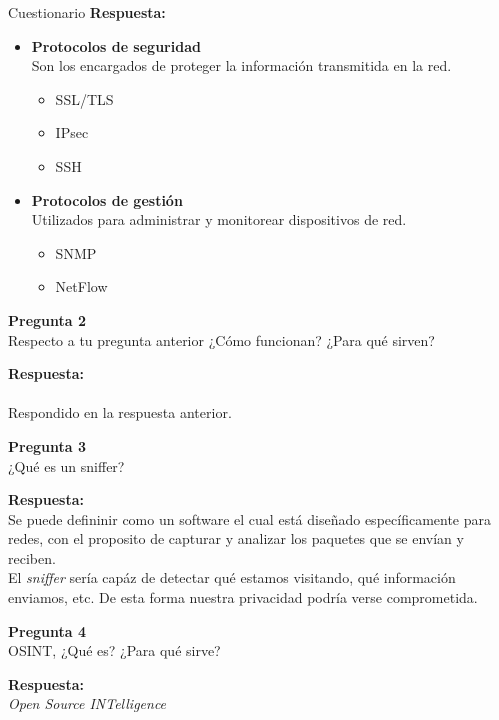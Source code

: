 \documentclass{article}
\newenvironment{problem}[2][Pregunta]
    { \begin{mdframed}[backgroundcolor=gray!20] \textbf{#1 #2} \\}
    {  \end{mdframed}}
\newenvironment{solution}
    {\textbf{Respuesta:\\}}
    {}
\begin{document}
\begin{section}{Cuestionario}
\begin{solution}
\begin{itemize}
        \item \textbf{Protocolos de seguridad}\\
        Son los encargados de proteger la información transmitida en la red.
        \begin{itemize}
            \item SSL/TLS
            \item IPsec
            \item SSH
        \end{itemize}

        \item \textbf{Protocolos de gestión}\\
        Utilizados para administrar y monitorear dispositivos de red.
        \begin{itemize}
            \item SNMP
            \item NetFlow
        \end{itemize}
    \end{itemize}
\end{solution}

\begin{problem}
    {2} Respecto a tu pregunta anterior ¿Cómo funcionan? ¿Para qué sirven?
\end{problem}

\begin{solution}\\
Respondido en la respuesta anterior.
\end{solution}  

\begin{problem}
    {3} ¿Qué es un sniffer?
\end{problem}

\begin{solution}
Se puede defininir como un software el cual está diseñado específicamente para redes, con el proposito de capturar y analizar los paquetes que se envían y reciben.\\
El \textit{sniffer} sería capáz de detectar qué estamos visitando, qué información enviamos, etc. De esta forma nuestra privacidad podría verse comprometida.
\end{solution}

\begin{problem}
    {4} OSINT, ¿Qué es? ¿Para qué sirve?
\end{problem}
\begin{solution}
\textit{Open Source INTelligence}\\


\end{solution}
\end{section}
\end{document}
